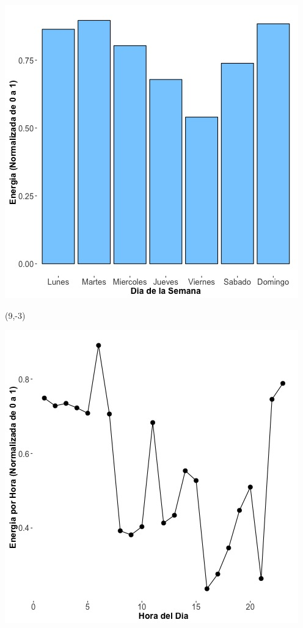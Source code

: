 \documentclass{article}\usepackage[]{graphicx}\usepackage[]{color}
\newenvironment{knitrout}{}{} %
\begin{document}
\begin{knitrout}
\color{fgcolor}
\includegraphics[scale=0.65]{figure/A9_day_of_week_plot} 
\end{knitrout}


 \begin{textblock}{1}(9,-3)
\begin{minipage}{20em}
\begingroup

\endgroup
\end{minipage}
\end{textblock}

 \vspace{2cm}

\begin{knitrout}
\color{fgcolor}
\includegraphics[scale=0.75]{figure/A9_fplot_norm_median} 
\end{knitrout}
\end{document}

